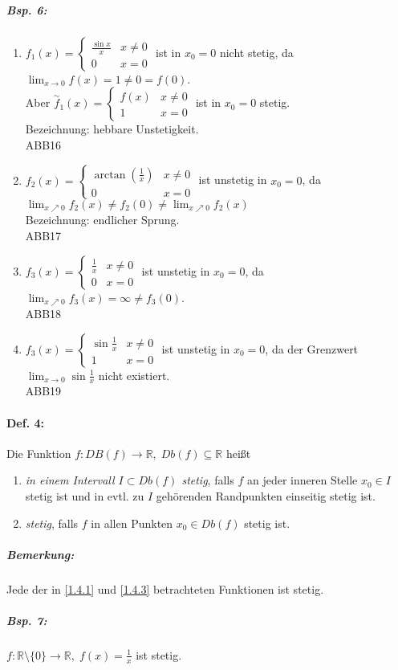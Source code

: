 \subparagraph{Bsp. 6:}
\begin{enumerate}[label=\alph*.)]
\item $f_1(x)=\begin{cases}
\frac{\sin x}{x} & x\not = 0 \\
0 & x = 0
\end{cases}$ ist in $x_0=0$ nicht stetig, da $\lim_{x\to 0} f(x) = 1 \not = 0 = f(0)$.\\
Aber $\overset{\sim}{f}_1(x)=\begin{cases}
f(x) & x\not = 0\\
1 & x= 0
\end{cases}$ ist in $x_0=0$ stetig.\\
Bezeichnung: hebbare Unstetigkeit.\\
ABB16
\item $f_2(x)=\begin{cases}
\arctan \left(\frac{1}{x}\right) & x\not = 0\\
0 & x = 0
\end{cases}$ ist unstetig in $x_0=0$, da $\lim_{x\nearrow 0}f_2(x) \not = f_2(0) \not = \lim_{x\nearrow 0} f_2(x)$\\
Bezeichnung: endlicher Sprung.\\
ABB17
\item $f_3(x)=\begin{cases}
\frac{1}{x} & x\not = 0\\
0 & x=0
\end{cases}$ ist unstetig in $x_0=0$, da $\lim_{x\nearrow 0}f_3(x) = \infty \not = f_3(0)$.\\
ABB18
\item $f_3(x)=\begin{cases}
\sin \frac{1}{x} & x \not = 0\\
1 & x=0
\end{cases}$ ist unstetig in $x_0=0$, da der Grenzwert $\lim_{x\to 0}\sin \frac{1}{x}$ nicht existiert.\\
ABB19
\end{enumerate}
\paragraph{Def. 4:} Die Funktion $f: DB(f) \to \mathbb{R}, \; Db(f) \subseteq \mathbb{R}$ heißt
\begin{enumerate}[label=\alph*.)]
\item \emph{in einem Intervall $I \subset Db(f)$ stetig}, falls $f$ an jeder inneren Stelle $x_0 \in I$ stetig ist und in evtl. zu $I$ gehörenden Randpunkten einseitig stetig ist.
\item \emph{stetig}, falls $f$ in allen Punkten $x_0\in Db(f)$ stetig ist.
\end{enumerate}
\subparagraph{Bemerkung:} Jede der in \ref{1.4.1} und \ref{1.4.3} betrachteten Funktionen ist stetig.
\subparagraph{Bsp. 7:} $f: \mathbb{R}\setminus \{0\} \to \mathbb{R}, \; f(x)=\frac{1}{x}$ ist stetig.

